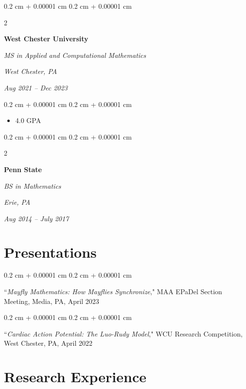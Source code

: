 \documentclass[10pt, letterpaper]{article}
\newenvironment{highlights}{
    \begin{itemize}[
        topsep=0.10 cm,
        parsep=0.10 cm,
        partopsep=0pt,
        itemsep=0pt,
        leftmargin=0.4 cm + 10pt
    ]
}{
    \end{itemize}
} %
\newenvironment{onecolentry}{
    \begin{adjustwidth}{
        0.2 cm + 0.00001 cm
    }{
        0.2 cm + 0.00001 cm
    }
}{
    \end{adjustwidth}
} %
\newenvironment{twocolentry}[2][]{
    \onecolentry
    \def\secondColumn{#2}
    \setcolumnwidth{\fill, 4.5 cm}
    \begin{paracol}{2}
}{
    \switchcolumn \raggedleft \secondColumn
    \end{paracol}
    \endonecolentry
} %
\begin{document}
        
        \begin{twocolentry}{
        \textit{West Chester, PA}    
            
        \textit{Aug 2021 – Dec 2023}}
            \textbf{West Chester University}

            \textit{MS in Applied and Computational Mathematics}
        \end{twocolentry}

        \vspace{0.10 cm}
        \begin{onecolentry}
            \begin{highlights}
                \item 4.0 GPA
            \end{highlights}
        \end{onecolentry}


        \vspace{0.2 cm}

        \begin{twocolentry}{
        \textit{Erie, PA}    
            
        \textit{Aug 2014 – July 2017}}
            \textbf{Penn State}

            \textit{BS in Mathematics}
        \end{twocolentry}




    
    \section{Presentations}



        
        \begin{onecolentry}
            ``\textit{Mayfly Mathematics: How Mayflies Synchronize}," MAA EPaDel Section Meeting, Media, PA, April 2023
        \end{onecolentry}

        \vspace{0.2 cm}

        \begin{onecolentry}
            ``\textit{Cardiac Action Potential: The Luo-Rudy Model}," WCU Research Competition, West Chester, PA, April 2022
        \end{onecolentry}


    
    \section{Research Experience}
\end{document}

